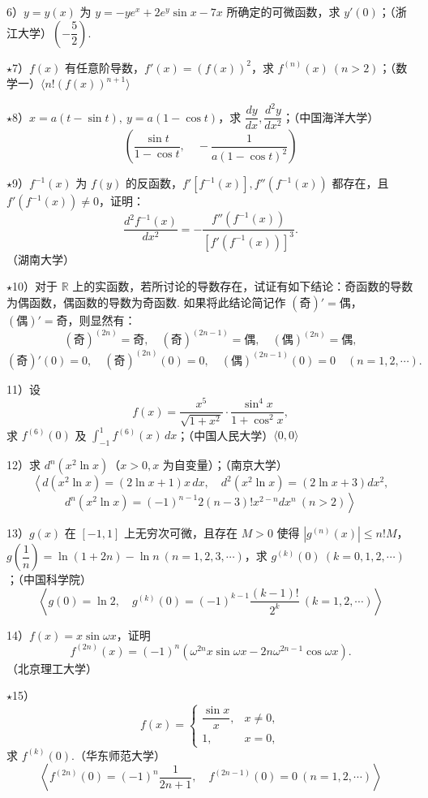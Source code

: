 \documentclass[UTF8,12pt,a4paper,fontset=fandol]{ctexart}
\begin{document}
6）$y=y(x)$ 为 $y=-ye^x+2e^y\sin x-7x$ 所确定的可微函数，求 $y'(0)$；（浙江大学）\quad $\left(-\dfrac52\right)$.

$\star$7）$f(x)$ 有任意阶导数，$f'(x)=(f(x))^2$，求 $f^{(n)}(x)\ (n>2)$；（数学一）\quad $\langle n!(f(x))^{n+1}\rangle$

$\star$8）$x=a(t-\sin t),\ y=a(1-\cos t)$，求 $\dfrac{dy}{dx},\dfrac{d^2y}{dx^2}$；（中国海洋大学）
\[
  \left(\frac{\sin t}{1-\cos t},\quad -\frac1{a(1-\cos t)^2}\right)
\]

$\star$9）$f^{-1}(x)$ 为 $f(y)$ 的反函数，$f'[f^{-1}(x)],f''(f^{-1}(x))$ 都存在，且 $f'(f^{-1}(x))\ne0$，证明：
\[
  \frac{d^2f^{-1}(x)}{dx^2}
  =-\frac{f''(f^{-1}(x))}{[f'(f^{-1}(x))]^3}.
\]
（湖南大学）

$\star$10）对于 $\mathbb R$ 上的实函数，若所讨论的导数存在，试证有如下结论：奇函数的导数为偶函数，偶函数的导数为奇函数. 如果将此结论简记作 $(\text{奇})'=\text{偶}$，$(\text{偶})'=\text{奇}$，则显然有：
\[
  (\text{奇})^{(2n)}=\text{奇},\quad
  (\text{奇})^{(2n-1)}=\text{偶},\quad
  (\text{偶})^{(2n)}=\text{偶},
\]
\[
  (\text{奇})'(0)=0,\quad
  (\text{奇})^{(2n)}(0)=0,\quad
  (\text{偶})^{(2n-1)}(0)=0\quad(n=1,2,\cdots).
\]

11）设
\[
  f(x)=\frac{x^5}{\sqrt{1+x^2}}\cdot\frac{\sin^4x}{1+\cos^2x},
\]
求 $f^{(6)}(0)$ 及 $\int_{-1}^1 f^{(6)}(x)\,dx$；（中国人民大学）\quad $\langle0,0\rangle$

12）求 $d^n(x^2\ln x)$（$x>0,x$ 为自变量）；（南京大学）
\[
  \left\langle d(x^2\ln x)=(2\ln x+1)x\,dx,\quad
  d^2(x^2\ln x)=(2\ln x+3)dx^2,\right.
\]
\[
  \left. d^n(x^2\ln x)=(-1)^{n-1}2(n-3)!x^{2-n}dx^n\ (n>2)\right\rangle
\]

13）$g(x)$ 在 $[-1,1]$ 上无穷次可微，且存在 $M>0$ 使得 $|g^{(n)}(x)|\le n!M$，$g\left(\dfrac1n\right)=\ln(1+2n)-\ln n\ (n=1,2,3,\cdots)$，求 $g^{(k)}(0)\ (k=0,1,2,\cdots)$；（中国科学院）
\[
  \left\langle g(0)=\ln2,\quad
  g^{(k)}(0)=(-1)^{k-1}\frac{(k-1)!}{2^k}\ (k=1,2,\cdots)\right\rangle
\]

14）$f(x)=x\sin\omega x$，证明
\[
  f^{(2n)}(x)=(-1)^n(\omega^{2n}x\sin\omega x-2n\omega^{2n-1}\cos\omega x).
\]
（北京理工大学）

$\star$15）
\[
f(x)=
\begin{cases}
\dfrac{\sin x}x, & x\ne0,\\
1, & x=0,
\end{cases}
\]
求 $f^{(k)}(0)$.（华东师范大学）
\[
  \left\langle f^{(2n)}(0)=(-1)^n\frac1{2n+1},\quad
  f^{(2n-1)}(0)=0\ (n=1,2,\cdots)\right\rangle
\]
\end{document}
